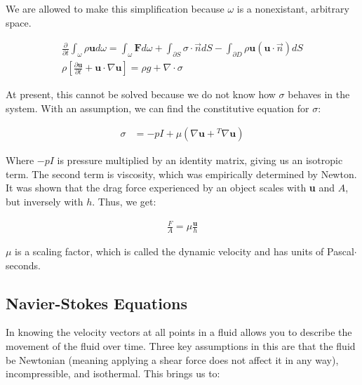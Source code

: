 We are allowed to make this simplification because $\omega$ is a nonexistant, arbitrary space. 







\begin{equation} \label{phenom1}
\begin{split}
\frac{\partial}{\partial t}\int_\omega \rho\mathbf{u}d\omega = \int_\omega \mathbf{F}d\omega + \int_{\partial S}\sigma \cdot \Vec{n}dS - \int_{\partial D}\rho \mathbf{u}(\mathbf{u}\cdot\Vec{n})dS\\
\rho[\frac{\partial \mathbf{u}}{\partial t} + \mathbf{u}\cdot\nabla \mathbf{u}] = \rho g + \nabla \cdot \sigma
\end{split}
\end{equation}

At present, this cannot be solved because we do not know how $\sigma$ behaves in the system. With an assumption, we can find the constitutive equation for $\sigma$:

\begin{equation} \label{phenom1}
\begin{split}
\sigma &= -p I + \mu(\nabla\mathbf{u} + {}^T\nabla\mathbf{u})
\end{split}
\end{equation}

Where $-pI$ is pressure multiplied by an identity matrix, giving us an isotropic term. The second term is viscosity, which was empirically determined by Newton. It was shown that the drag force experienced by an object scales with \textbf{u} and $A$, but inversely with $h$. Thus, we get:

\begin{equation} \label{phenom1}
\begin{split}
\frac{F}{A} = \mu \frac{\mathbf{u}}{h} 
\end{split}
\end{equation}

$\mu$ is a scaling factor, which is called the dynamic velocity and has units of Pascal$\cdot$seconds. 

\subsection{Navier-Stokes Equations}

\label{sec:imstoked}

In knowing the velocity vectors at all points in a fluid allows you to describe the movement of the fluid over time. Three key assumptions in this are that the fluid be Newtonian (meaning applying a shear force does not affect it in any way), incompressible, and isothermal. This brings us to:

